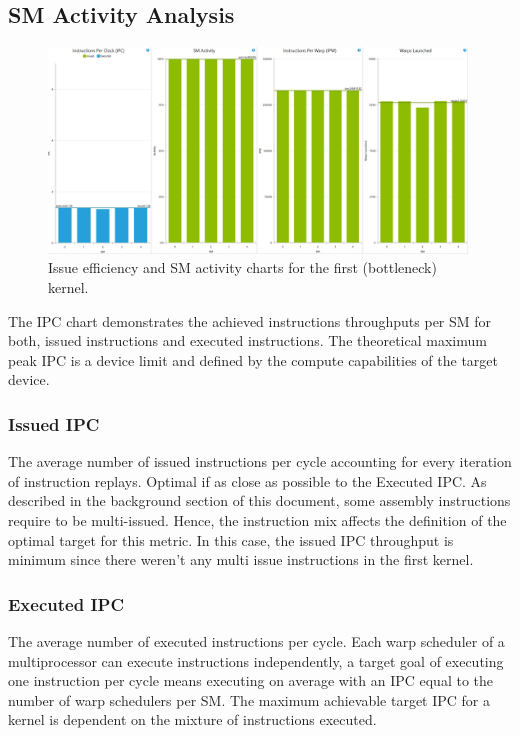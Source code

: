\subsection{SM Activity Analysis}
\begin{figure}[!h]\centering
	\includegraphics[width=0.99\textwidth]{sm_activity.PNG}
	\caption{Issue efficiency and SM activity charts for the first (bottleneck) kernel.}
	\label{pl1}
\end{figure}
The IPC chart demonstrates the achieved instructions throughputs per SM for both, issued instructions and executed instructions. The theoretical maximum peak IPC is a device limit and defined by the compute capabilities of the target device.

\subsubsection{Issued IPC}
The average number of issued instructions per cycle accounting for every iteration of instruction replays. Optimal if as close as possible to the Executed IPC. As described in the background section of this document, some assembly instructions require to be multi-issued. Hence, the instruction mix affects the definition of the optimal target for this metric. In this case, the issued IPC throughput is minimum since there weren't any multi issue instructions in the first kernel.

\subsubsection{Executed IPC}
The average number of executed instructions per cycle. Each warp scheduler of a multiprocessor can execute instructions independently, a target goal of executing one instruction per cycle means executing on average with an IPC equal to the number of warp schedulers per SM. The maximum achievable target IPC for a kernel is dependent on the mixture of instructions executed. 

